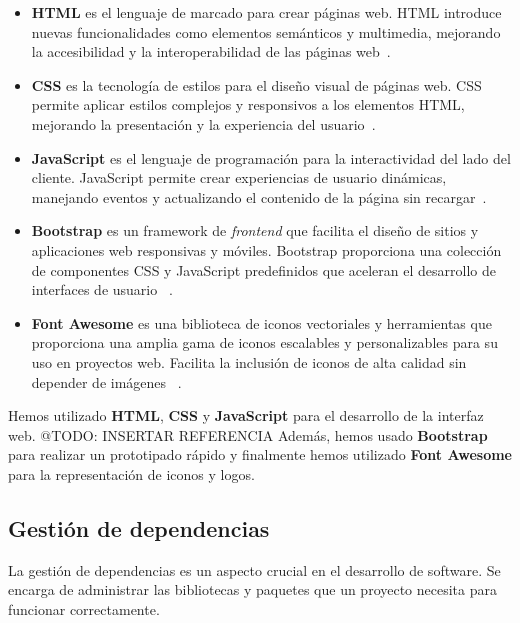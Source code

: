 \begin{itemize}
    \item \textbf{HTML} es el lenguaje de marcado para crear páginas web.
    HTML introduce nuevas funcionalidades como elementos semánticos y multimedia, mejorando la accesibilidad y la
    interoperabilidad de las páginas web~\cite{https://www.w3.org/TR/html5/}.
    \item \textbf{CSS} es la tecnología de estilos para el diseño visual de páginas web.
    CSS permite aplicar estilos complejos y responsivos a los elementos HTML, mejorando la presentación y la
    experiencia del usuario~\cite{https://www.w3.org/Style/CSS/}.
    \item \textbf{JavaScript} es el lenguaje de programación para la interactividad del lado del cliente.
    JavaScript permite crear experiencias de usuario dinámicas, manejando eventos y actualizando el contenido de la
    página sin recargar~\cite{https://www.ecma-international.org/publications-and-standards/standards/ecma-262/}.
    \item \textbf{Bootstrap} es un framework de \textit{frontend} que facilita el diseño de sitios y aplicaciones web
    responsivas y móviles.
    Bootstrap proporciona una colección de componentes CSS y JavaScript predefinidos que aceleran el desarrollo de
    interfaces de usuario ~\cite{https://getbootstrap.com/}.
    \item \textbf{Font Awesome} es una biblioteca de iconos vectoriales y herramientas que proporciona una amplia
    gama de iconos escalables y personalizables para su uso en proyectos web.
    Facilita la inclusión de iconos de alta calidad sin depender de imágenes ~\cite{https://fontawesome.com/}.
\end{itemize}

Hemos utilizado \textbf{HTML}, \textbf{CSS} y \textbf{JavaScript} para el desarrollo de la interfaz web.
\colorbox{color_highlight}{@TODO: INSERTAR REFERENCIA}
Además, hemos usado \textbf{Bootstrap} para realizar un prototipado rápido y finalmente hemos utilizado
\textbf{Font Awesome} para la representación de iconos y logos.


\subsection*{Gestión de dependencias}

La gestión de dependencias es un aspecto crucial en el desarrollo de software.
Se encarga de administrar las bibliotecas y paquetes que un proyecto necesita para funcionar correctamente.

